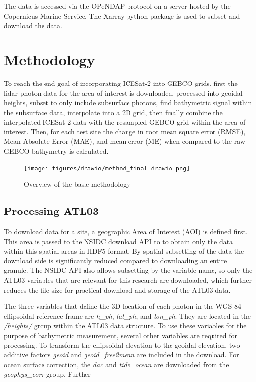 The data is accessed via the OPeNDAP protocol on a server hosted by the Copernicus Marine Service. The Xarray python package \parencite{hoyer_stephan_2022_6323468,hoyer2017xarray} is used to subset and download the data.



\section{Methodology}

To reach the end goal of incorporating ICESat-2 into GEBCO grids, first the lidar photon data for the area of interest is downloaded, processed into geoidal heights, subset to only include subsurface photons, find bathymetric signal within the subsurface data, interpolate into a 2D grid, then finally combine the interpolated ICESat-2 data with the resampled GEBCO grid within the area of interest. Then, for each test site the change in root mean square error (RMSE), Mean Absolute Error (MAE), and mean error (ME) when compared to  the raw GEBCO bathymetry is calculated. 

\begin{figure}[h]
    \centering
    \texttt{[image: figures/drawio/method\_final.drawio.png]}
    \caption{Overview of the basic methodology}
    \label{fig:methodology-overview}
\end{figure}

\subsection{Processing ATL03}

To download data for a site, a geographic Area of Interest (AOI) is defined first. This area is passed to the NSIDC download API to to obtain only the data within this spatial areas in HDF5 format. By spatial subsetting of the data the download side is significantly reduced compared to downloading an entire granule. The NSIDC API also allows subsetting by the variable name, so only the ATL03 variables that are relevant for this research are downloaded, which further reduces the file size for practical download and storage of the ATL03 data. 

The three variables that define the 3D location of each photon in the WGS-84 ellipsoidal reference frame are \emph{h\_ph}, \emph{lat\_ph}, and \emph{lon\_ph}. They are located in the \emph{/heights/} group within the ATL03 data structure. To use these variables for the purpose of bathymetric measurement, several other variables are required for processing. To transform the ellipsoidal elevation to the geoidal elevation, two additive factors \emph{geoid} and \emph{geoid\_free2mean} are included in the download. For ocean surface correction, the \emph{dac} and \emph{tide\_ocean} are downloaded from the \emph{geophys\_corr} group. Further

